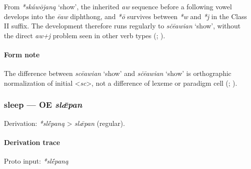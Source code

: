 \documentclass[
  british,
  a4paper,
]{article}
\providecommand{\Recon}[1]{\emph{*#1}}
\begin{document}
From \Recon{skáwōjaną} `show', the inherited \emph{aw} sequence before a
following vowel develops into the \emph{ēaw} diphthong, and \emph{*ō}
survives between \emph{*w} and \emph{*j} in the Class II suffix. The
development therefore runs regularly to {\emph{sċēawian}} `show',
without the direct \emph{aw+j} problem seen in other verb types
(;
).

\paragraph{Form note}\label{form-note-16}

The difference between {\emph{scēawian}} `show' and {\emph{sċēawian}}
`show' is orthographic normalization of initial
\textless{}\emph{sc}\textgreater, not a difference of lexeme or paradigm
cell (;
).

\subsubsection{\texorpdfstring{sleep --- OE
\emph{slǣpan}}{sleep --- OE slǣpan}}\label{sleep-oe-slux1e3pan}

Derivation: \emph{*slḗpaną} \textgreater{} \emph{slǣpan} (regular).

\paragraph{Derivation trace}\label{derivation-trace-54}

Proto input: \emph{*slḗpaną}

\begingroup
\setlength{\fboxsep}{6pt}
\end{document}
